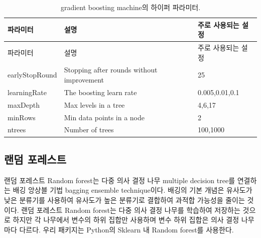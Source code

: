 \documentclass[10.5pt]{book}
\theoremstyle{definition}
\theoremstyle{definition}
\theoremstyle{definition}
\theoremstyle{remark}
\begin{document}
\begin{longtable}[]{@{}lll@{}}
\caption{\label{tab:gbmParameters} gradient boosting machine의 하이퍼
파라미터.}\tabularnewline
\toprule
파라미터 & 설명 & 주로 사용되는 설정\tabularnewline
\midrule
\endfirsthead
\toprule
파라미터 & 설명 & 주로 사용되는 설정\tabularnewline
\midrule
\endhead
earlyStopRound & Stopping after rounds without improvement &
25\tabularnewline
learningRate & The boosting learn rate & 0.005,0.01,0.1\tabularnewline
maxDepth & Max levels in a tree & 4,6,17\tabularnewline
minRows & Min data points in a node & 2\tabularnewline
ntrees & Number of trees & 100,1000\tabularnewline
\bottomrule
\end{longtable}

\subsection{랜덤 포레스트}\label{-}

랜덤 포레스트 Random forest는 다중 의사 결정 나무 multiple decision
tree를 연결하는 배깅 앙상블 기법 bagging ensemble technique이다. 배깅의
기본 개념은 유사도가 낮은 분류기를 사용하여 유사도가 높은 분류기로
결합하여 과적합 가능성을 줄이는 것이다. 랜덤 포레스트 Random forest는
다중 의사 결정 나무를 학습하여 저장하는 것으로 하지만 각 나무에서 변수의
하위 집합만 사용하며 변수 하위 집합은 의사 결정 나무마다 다르다. 우리
패키지는 Python의 Sklearn 내 Random forest를 사용한다.
  
\end{document}
